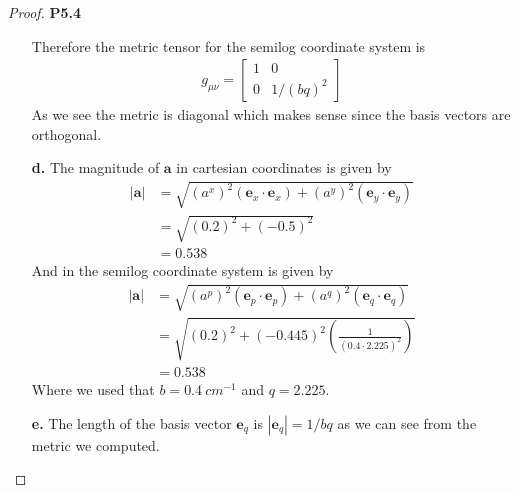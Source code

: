 \documentclass[11pt]{article}
\theoremstyle{definition}
\begin{document}
\begin{proof}{\textbf{P5.4}}
\begin{itemize}
        Therefore the metric tensor for the semilog coordinate system is
        \begin{align*}
            g_{\mu\nu} = \begin{bmatrix}
                1 & 0 \\ 0 & 1/(bq)^2
            \end{bmatrix}
        \end{align*}
        As we see the metric is diagonal which makes sense since the basis vectors
        are orthogonal.
        \item[\bf{d.}] The magnitude of $\bm{a}$ in cartesian coordinates is
        given by
        \begin{align*}
            |\bm{a}| &= \sqrt{(a^x)^2(\bm{e}_x\cdot \bm{e}_x) + (a^y)^2(\bm{e}_y\cdot \bm{e}_y)}\\
                &= \sqrt{(0.2)^2 + (-0.5)^2}\\
                &= 0.538
        \end{align*}
        And in the semilog coordinate system is given by
        \begin{align*}
            |\bm{a}| &= \sqrt{(a^p)^2(\bm{e}_p\cdot \bm{e}_p) + (a^q)^2(\bm{e}_q\cdot \bm{e}_q)}\\
                &= \sqrt{(0.2)^2 + (-0.445)^2\left(\frac{1}{(0.4 \cdot 2.225)^2}\right)}\\
                &= 0.538
        \end{align*}
        Where we used that $b=0.4~cm^{-1}$ and $q = 2.225$.
        
        \item[\bf{e.}] The length of the basis vector $\bm{e}_q$ is
        $|\bm{e}_q| = 1/bq$ as we can see from the metric we computed.
    \end{itemize}
\end{proof}
\cleardoublepage
\end{document}

